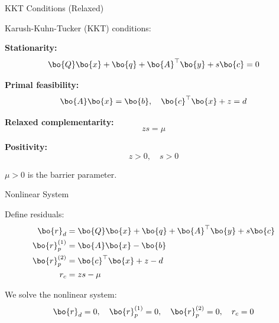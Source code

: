 \documentclass{beamer}
\begin{document}
\begin{frame}{KKT Conditions (Relaxed)}
	\begin{flushleft}
		
		Karush-Kuhn-Tucker (KKT) conditions:
		
		\vspace{0.5em}
		
		\textbf{Stationarity:}
		\[
		\bo{Q}\bo{x} + \bo{q} + \bo{A}^\top \bo{y} + s \bo{c} = 0
		\]
		
		\textbf{Primal feasibility:}
		\[
		\bo{A}\bo{x} = \bo{b}, \quad \bo{c}^\top \bo{x} + z = d
		\]
		
		\textbf{Relaxed complementarity:}
		\[
		z s = \mu
		\]
		
		\textbf{Positivity:}
		\[
		z > 0, \quad s > 0
		\]
		
		\vspace{0.5em}
		
		$\mu > 0$ is the barrier parameter.
		
	\end{flushleft}
\end{frame}


\begin{frame}{Nonlinear System}
	\begin{flushleft}
		
		Define residuals:
		\begin{align*}
			\bo{r}_d &= \bo{Q}\bo{x} + \bo{q} + \bo{A}^\top \bo{y} + s \bo{c} \\
			\bo{r}_p^{(1)} &= \bo{A}\bo{x} - \bo{b} \\
			\bo{r}_p^{(2)} &= \bo{c}^\top \bo{x} + z - d \\
			r_c &= z s - \mu
		\end{align*}
		
		\vspace{0.5em}
		
		We solve the nonlinear system:
		\[
		\bo{r}_d = 0, \quad \bo{r}_p^{(1)} = 0, \quad \bo{r}_p^{(2)} = 0, \quad r_c = 0
		\]
		
	\end{flushleft}
\end{frame}
\end{document}
